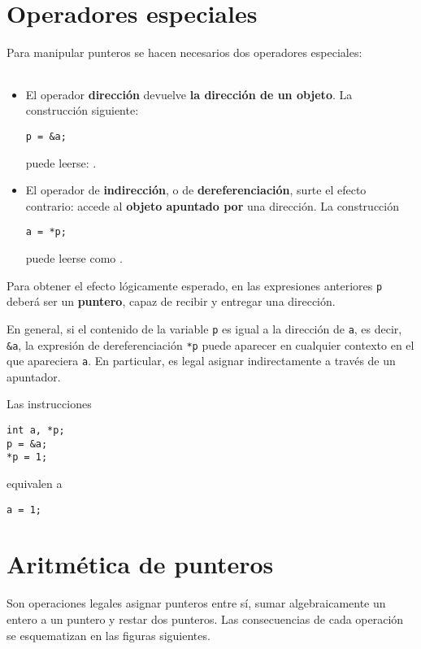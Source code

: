 \section{Operadores especiales}
Para manipular punteros se hacen necesarios dos operadores especiales:

\begin{tabular}{c|l}
\end{tabular}


\begin{itemize}
	\item El operador \textbf{dirección} devuelve \textbf{la dirección de un objeto}. La construcción
siguiente:
\begin{lstlisting}
p = &a;
\end{lstlisting}
puede leerse: .
\item El operador de \textbf{indirección}, o de \textbf{dereferenciación}, surte el efecto contrario:
accede al \textbf{objeto apuntado por} una dirección. La construcción
\begin{lstlisting}
a = *p;
\end{lstlisting}
puede leerse como .
\end{itemize}


Para obtener el efecto lógicamente esperado, en las expresiones anteriores
\lstinline{p} deberá ser un \textbf{puntero}, capaz de recibir y entregar una dirección.

En general, si el contenido de la variable \texttt{p} es igual a la dirección de \lstinline{a}, es decir, \lstinline{&a}, la expresión de dereferenciación \lstinline{*p} puede aparecer
en cualquier contexto en el que apareciera \lstinline{a}. En particular, es legal asignar
indirectamente a través de un apuntador. 

\begin{ejemplo}
Las instrucciones
\begin{lstlisting}
int a, *p;
p = &a;
*p = 1;
\end{lstlisting}
equivalen a
\begin{lstlisting}
a = 1;
\end{lstlisting}
\end{ejemplo}

\section{Aritmética de punteros}
Son operaciones legales asignar punteros entre sí, sumar algebraicamente un
entero a un puntero y restar dos punteros. Las consecuencias de cada operación
se esquematizan en las figuras siguientes.

